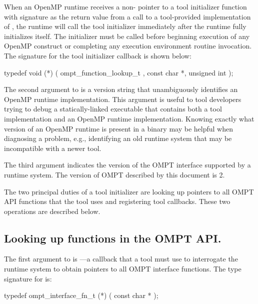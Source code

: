 When an OpenMP runtime receives a non- pointer to a tool initializer function with signature  as the return value from a call to a tool-provided implementation of , the runtime will call the tool initializer immediately after the runtime fully initializes itself.
The initializer must be called before beginning execution of any OpenMP construct or completing any execution environment routine invocation.
The signature for the tool initializer callback is shown below:

\begin{boxedcode}
typedef void (*) (
  ompt\_function\_lookup\_t ,
  const char *, 
  unsigned int 
);
\end{boxedcode}

The second argument to  is a version string that unambiguously identifies an OpenMP runtime implementation.
This argument is useful to tool developers trying to debug a statically-linked executable that contains both a tool implementation and an OpenMP runtime implementation.
Knowing exactly what version of an OpenMP runtime is present in a binary may be helpful when diagnosing a problem, e.g., identifying an old runtime system that may be incompatible with a newer tool.

The third argument  indicates the version of the OMPT interface supported by a runtime system.
The version of OMPT described by this document is 2.

The two principal duties of a tool initializer are looking up pointers to all OMPT API functions that the tool uses and registering tool callbacks.
These two operations are described below.

\subsection{Looking up functions in the OMPT API.}
The first argument to  is ---a callback that a tool must use to interrogate the runtime system to obtain pointers to all OMPT interface functions.
The type signature for  is:

\begin{boxedcode}
typedef ompt\_interface\_fn\_t (*) (
  const char *
);
\end{boxedcode}

